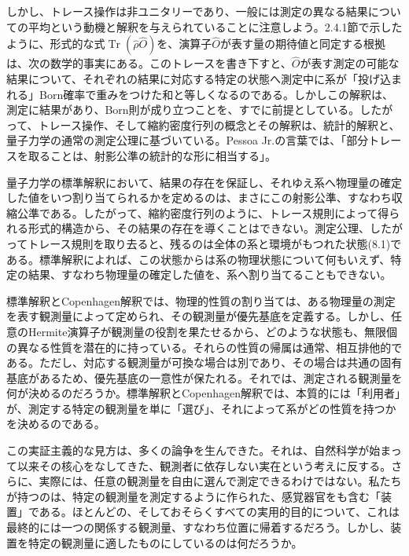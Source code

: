 しかし、トレース操作は非ユニタリーであり、一般には測定の異なる結果についての平均という動機と解釈を与えられていることに注意しよう。2.4.1節で示したように、形式的な式$\operatorname{Tr}(\hat\rho\hat O)$を、演算子$\hat O$が表す量の期待値と同定する根拠は、次の数学的事実にある。このトレースを書き下すと、$\hat O$が表す測定の可能な結果について、それぞれの結果に対応する特定の状態へ測定中に系が「投げ込まれる」Born確率で重みをつけた和と等しくなるのである。しかしこの解釈は、測定に結果があり、Born則が成り立つことを、すでに前提としている。したがって、トレース操作、そして縮約密度行列の概念とその解釈は、統計的解釈と、量子力学の通常の測定公理に基づいている。Pessoa Jr.\cite[432頁]{ref064}の言葉では、「部分トレースを取ることは、射影公準の統計的な形に相当する」。

量子力学の標準解釈において、結果の存在を保証し、それゆえ系へ物理量の確定した値をいつ割り当てられるかを定めるのは、まさにこの射影公準、すなわち収縮公準である。したがって、縮約密度行列のように、トレース規則によって得られる形式的構造から、その結果の存在を導くことはできない。測定公理、したがってトレース規則を取り去ると、残るのは全体の系と環境がもつれた状態(8.1)である。標準解釈によれば、この状態からは系の物理状態について何もいえず、特定の結果、すなわち物理量の確定した値を、系へ割り当てることもできない。


\hypertarget{srcpage:334}{}\label{srcpage:334}
標準解釈とCopenhagen解釈では、物理的性質の割り当ては、ある物理量の測定を表す観測量によって定められ、その観測量が優先基底を定義する。しかし、任意のHermite演算子が観測量の役割を果たせるから、どのような状態も、無限個の異なる性質を潜在的に持っている。それらの性質の帰属は通常、相互排他的である。ただし、対応する観測量が可換な場合は別であり、その場合は共通の固有基底があるため、優先基底の一意性が保たれる。それでは、測定される観測量を何が決めるのだろうか。標準解釈とCopenhagen解釈では、本質的には「利用者」が、測定する特定の観測量を単に「選び」、それによって系がどの性質を持つかを決めるのである。

この実証主義的な見方は、多くの論争を生んできた。それは、自然科学が始まって以来その核心をなしてきた、観測者に依存しない実在という考えに反する。さらに、実際には、任意の観測量を自由に選んで測定できるわけではない。私たちが持つのは、特定の観測量を測定するように作られた、感覚器官をも含む「装置」である。ほとんどの、そしておそらくすべての実用的目的について、これは最終的には一つの関係する観測量、すなわち位置に帰着するだろう。しかし、装置を特定の観測量に適したものにしているのは何だろうか。


